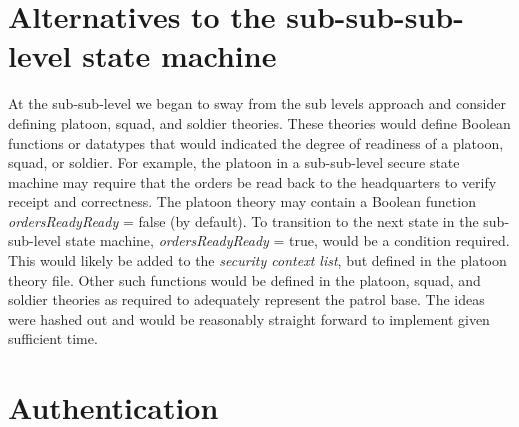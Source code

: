 
\section{Alternatives to the sub-sub-sub-level state machine}
\label{sec:alternatives-sub-sub-1}


At the sub-sub-level we began to sway from the sub levels approach and consider defining
platoon, squad, and soldier theories. These theories would define Boolean functions or
datatypes that would indicated the degree of readiness of a platoon, squad, or soldier.
For example, the platoon in a sub-sub-level secure state machine may require that the
orders be read back to the headquarters to verify receipt and correctness. The platoon
theory may contain a Boolean function \textit{ordersReadyReady} = false (by default). To transition
to the next state in the sub-sub-level state machine, \textit{ordersReadyReady} = true, would be
a condition required. This would likely be added to the \textit{security context list}, but defined
in the platoon theory file. Other such functions would be defined in the platoon, squad,
and soldier theories as required to adequately represent the patrol base. The ideas were
hashed out and would be reasonably straight forward to implement given sufficient time.


\section{Authentication}
\label{sec:authentication-3}



